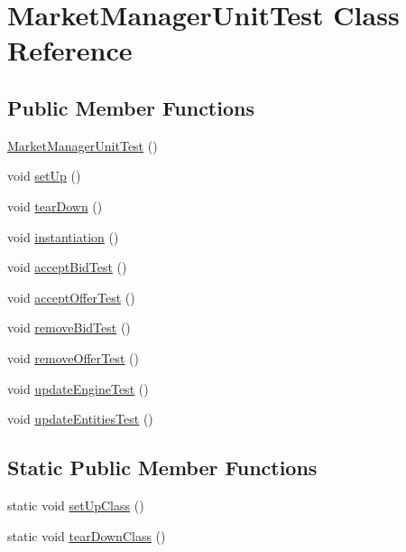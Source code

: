 \hypertarget{class_market_manager_unit_test}{\section{Market\+Manager\+Unit\+Test Class Reference}
\label{class_market_manager_unit_test}
}
\subsection*{Public Member Functions}
\begin{DoxyCompactItemize}
\item 
\hyperlink{class_market_manager_unit_test_ad67ee1cfc8c8f11b6a3bef139ed7432e}{Market\+Manager\+Unit\+Test} ()
\item 
void \hyperlink{class_market_manager_unit_test_a7675c43ec3a21669742870c5ff7bcdef}{set\+Up} ()
\item 
void \hyperlink{class_market_manager_unit_test_a8ce1dfb5c96973d49b3b1308bc9b77b9}{tear\+Down} ()
\item 
void \hyperlink{class_market_manager_unit_test_a975ffc40c27926b93d755a313440c35a}{instantiation} ()
\item 
void \hyperlink{class_market_manager_unit_test_aadbb351148ad8792ffdc73d21a477d46}{accept\+Bid\+Test} ()
\item 
void \hyperlink{class_market_manager_unit_test_a048bcd980b57e21cf535525c3d354327}{accept\+Offer\+Test} ()
\item 
void \hyperlink{class_market_manager_unit_test_ad15bca438fb420eb4edc10d2a6d5d69b}{remove\+Bid\+Test} ()
\item 
void \hyperlink{class_market_manager_unit_test_a3a39f91093490fa570428eeadbee53d8}{remove\+Offer\+Test} ()
\item 
void \hyperlink{class_market_manager_unit_test_a1c14446d8fae8ccdc8bbfb43054a5528}{update\+Engine\+Test} ()
\item 
void \hyperlink{class_market_manager_unit_test_ac830f868e90ae29122ae6382a4d227de}{update\+Entities\+Test} ()
\end{DoxyCompactItemize}
\subsection*{Static Public Member Functions}
\begin{DoxyCompactItemize}
\item 
static void \hyperlink{class_market_manager_unit_test_a5ecff1008c99832638bca96b9a12c129}{set\+Up\+Class} ()
\item 
static void \hyperlink{class_market_manager_unit_test_a6384859a83037cf70ee3a30835e9067e}{tear\+Down\+Class} ()
\end{DoxyCompactItemize}


